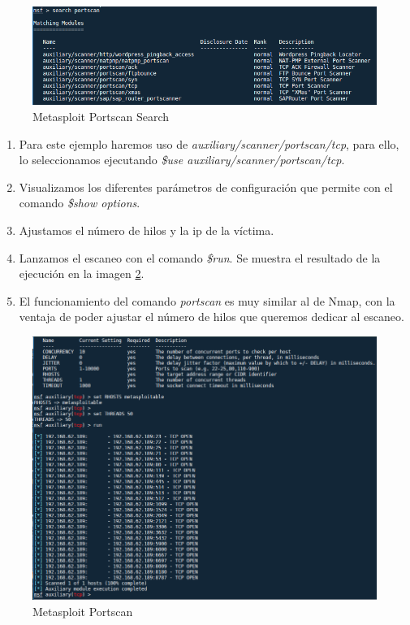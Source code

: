 \documentclass[a4,12pt,onecolum]{article}
\begin{document}
\begin{figure}[htbp]
\centering
\includegraphics[width=1.0\textwidth]{./images/Atacante_metasploit_portscan_search.png}
\caption{Metasploit Portscan Search}
\label{fig:meta2}
\end{figure}

\begin{enumerate}
\item Para este ejemplo haremos uso de \emph{auxiliary/scanner/portscan/tcp}, para ello, lo seleccionamos ejecutando \emph{\$use auxiliary/scanner/portscan/tcp}.
\item Visualizamos los diferentes parámetros de configuración que permite con el comando \emph{\$show options}.
\item Ajustamos el número de hilos y la ip de la víctima.
\item Lanzamos el escaneo con el comando \emph{\$run}. Se muestra el resultado de la ejecución en la imagen \ref{fig:meta1}.
\item El funcionamiento del comando \emph{portscan} es muy similar al de Nmap, con la ventaja de poder ajustar el número de hilos que queremos dedicar al escaneo.
\end{enumerate}

\begin{figure}[htbp]
\centering
\includegraphics[width=1.0\textwidth]{./images/Atacante_metasploit_portscan.png}
\caption{Metasploit Portscan}
\label{fig:meta1}
\end{figure}
\end{document}
